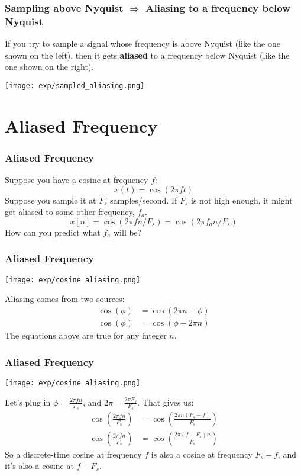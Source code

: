 \documentclass{beamer}
\begin{document}
\begin{frame}
  \frametitle{Sampling above Nyquist $\Rightarrow$ Aliasing to a frequency below Nyquist}

  If you try to sample a signal whose frequency is above Nyquist (like
  the one shown on the left), then it gets {\bf aliased} to a frequency below Nyquist
  (like the one shown on the right).
  \centerline{\texttt{[image: exp/sampled\_aliasing.png]}}
\end{frame}


\section[Aliased Frequency]{Aliased Frequency}
\setcounter{subsection}{1}

\begin{frame}
  \frametitle{Aliased Frequency}

  Suppose you have a cosine at frequency $f$:
  \[
  x(t) = \cos(2\pi ft)
  \]
  Suppose you sample it at $F_s$ samples/second.  If $F_s$ is not high
  enough, it might get aliased to some other frequency, $f_a$.
  \[
  x[n] = \cos(2\pi f n/F_s) = \cos(2\pi f_a n/F_s)
  \]
  How can you predict what $f_a$ will be?
\end{frame}

\begin{frame}
  \frametitle{Aliased Frequency}

  \centerline{\texttt{[image: exp/cosine\_aliasing.png]}}
  Aliasing comes from two sources:
  \begin{align*}
    \cos(\phi) &= \cos(2\pi n -\phi)\\
    \cos(\phi) &= \cos(\phi-2\pi n)
  \end{align*}
  The equations above are true for any integer $n$.
\end{frame}


\begin{frame}
  \frametitle{Aliased Frequency}

  \centerline{\texttt{[image: exp/cosine\_aliasing.png]}}
  Let's plug in $\phi=\frac{2\pi fn}{F_s}$, and $2\pi = \frac{2\pi
    F_s}{F_s}$.  That gives us:
  \begin{align*}
    \cos\left(\frac{2\pi fn}{F_s}\right) &= \cos\left(\frac{2\pi n(F_s-f)}{F_s}\right)\\
    \cos\left(\frac{2\pi fn}{F_s}\right) &= \cos\left(\frac{2\pi (f-F_s)n}{F_s}\right)
  \end{align*}
  So a discrete-time cosine at frequency $f$ is also a cosine at
  frequency $F_s-f$, and it's also a cosine at $f-F_s$.
\end{frame}
\end{document}
